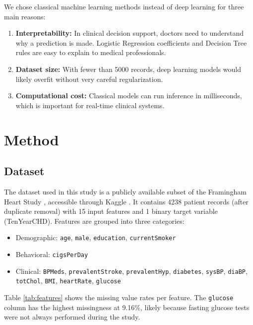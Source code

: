 \documentclass[conference]{IEEEtran}
\begin{document}
We chose classical machine learning methods instead of deep learning for three main reasons:
\begin{enumerate}
    \item \textbf{Interpretability:} In clinical decision support, doctors need to understand why a prediction is made. Logistic Regression coefficients and Decision Tree rules are easy to explain to medical professionals.
    \item \textbf{Dataset size:} With fewer than 5000 records, deep learning models would likely overfit without very careful regularization.
    \item \textbf{Computational cost:} Classical models can run inference in milliseconds, which is important for real-time clinical systems.
\end{enumerate}

\section{Method}

\subsection{Dataset}

The dataset used in this study is a publicly available subset of the Framingham Heart Study \cite{b1}, accessible through Kaggle \cite{b2,b3}. It contains 4238 patient records (after duplicate removal) with 15 input features and 1 binary target variable (TenYearCHD). Features are grouped into three categories:

\begin{itemize}
    \item Demographic: \texttt{age}, \texttt{male}, \texttt{education}, \texttt{currentSmoker}
    \item Behavioral: \texttt{cigsPerDay}
    \item Clinical: \texttt{BPMeds}, \texttt{prevalentStroke}, \texttt{prevalentHyp}, \texttt{diabetes}, \texttt{sysBP}, \texttt{diaBP}, \texttt{totChol}, \texttt{BMI}, \texttt{heartRate}, \texttt{glucose}
\end{itemize}

Table \ref{tab:features} shows the missing value rates per feature. The \texttt{glucose} column has the highest missingness at 9.16\%, likely because fasting glucose tests were not always performed during the study.
\end{document}
